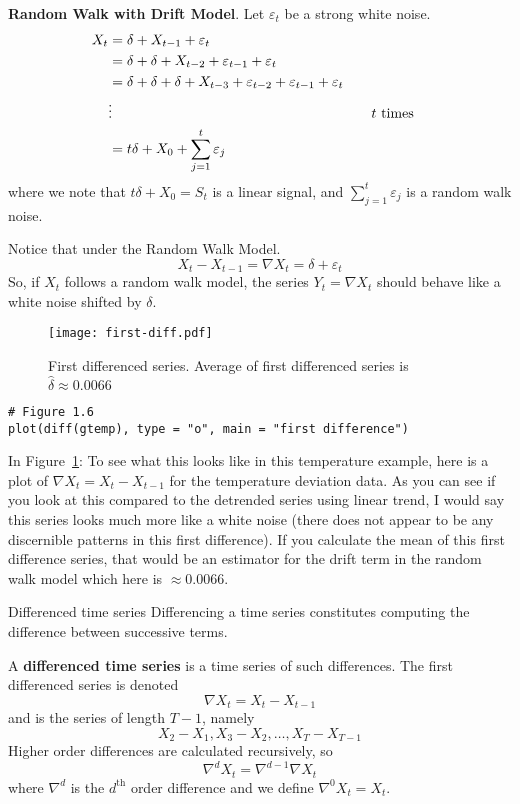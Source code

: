 \textbf{Random Walk with Drift Model}. Let $ \varepsilon_t $ be a strong white noise.
\begin{align*}
    X_t
     & =\delta+X_{t-1}+\varepsilon_t                                                                                  \\
     & =\delta+\delta+X_{t-2}+\varepsilon_{t-1}+\varepsilon_t                                                         \\
     & =\delta+\delta+\delta+X_{t-3}+\varepsilon_{t-2}+\varepsilon_{t-1}+\varepsilon_{t}                              \\
     & \vdots                                                                            & \quad & \text{$ t $ times} \\
     & =t\delta+X_0+\sum_{j=1}^{t} \varepsilon_j
\end{align*}
where we note that $ t\delta+X_0=S_t $ is a linear signal,
and $ \sum_{j=1}^{t} \varepsilon_j $ is a
random walk noise.

Notice that under the Random Walk Model.
\[ X_t-X_{t-1}=\nabla X_t=\delta+\varepsilon_t \]
So, if $ X_t $ follows a random walk model, the series $ Y_t=\nabla X_t $
should behave like a white noise shifted by $ \delta $.
\begin{figure}[!htbp]
    \centering
    \texttt{[image: first-diff.pdf]}
    \caption{First differenced series. Average of first differenced series
        is $ \hat{\delta}\approx 0.0066 $}\label{fig:firstdiff}
\end{figure}
\begin{verbatim}
# Figure 1.6
plot(diff(gtemp), type = "o", main = "first difference")
\end{verbatim}
In Figure~\ref{fig:firstdiff}:
{\color{blue}To see what this looks like in this temperature example, here is a plot
of $ \nabla X_t=X_t-X_{t-1} $ for the temperature deviation data. As you can
see if you look at this compared to the detrended series using linear trend,
I would say this series looks much more like a white noise (there does not
appear to be any discernible patterns in this first difference). If you calculate the mean
of this first difference series, that would be an estimator for the drift term
in the random walk model which here is $ \approx 0.0066 $.}

\begin{Definition}{Differenced time series}{}
    Differencing a time series constitutes
    computing the difference between successive terms.

    A \textbf{differenced time series} is a time series of such differences.
    The first differenced series is denoted
    \[ \nabla X_t=X_t-X_{t-1} \]
    and is the series of length $ T-1 $, namely
    \[ X_2-X_1,X_3-X_2,\ldots,X_T-X_{T-1} \]
    Higher order differences are calculated recursively, so
    \[ \nabla^d X_t=\nabla^{d-1}\nabla X_t \]
    where $ \nabla^d $ is the $ d^{\text{th}} $ order difference and
    we define $ \nabla^0 X_t=X_t $.
\end{Definition}

